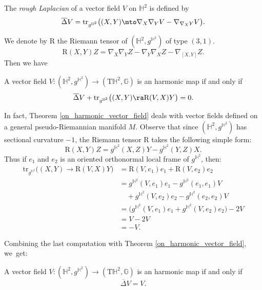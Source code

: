 \begin{defi}
The \emph{rough Laplacian} of a vector field $V$ on $\mathbb{H}^2$ is defined by
\[
\overline{\Delta}V=\mathrm{tr}_{g^{\mathbb{H}^2}}\big((X,Y)\mto \nabla_X\nabla_Y V-\nabla_{\nabla_X Y}V \big).
\]
\end{defi}
We denote by $\mathrm{R}$ the Riemann tensor of $(\mathbb{H}^2,g^{\mathbb{H}^2})$ of type $(3,1)$.
\[
\mathrm{R}(X,Y)Z=\nabla_X\nabla_YZ-\nabla_Y\nabla_XZ-\nabla_{[X,Y]}Z.
\]
Then we have
\begin{theorem}\label{on_harmonic_vector_field}
A vector field $V:(\mathbb{H}^2,g^{\mathbb{H}^2})\to(\mathrm{T}\mathbb{H}^2,\mathbb{G})$ is an harmonic map if and only if
\[
\overline{\Delta}V+\mathrm{tr}_{g^{\mathbb{H}^2}}\big((X,Y)\ra\mathrm{R}(V,X)Y \big)=0.
\]
\end{theorem}
In fact, Theorem \ref{on_harmonic_vector_field} deals with vector fields defined on a general pseudo-Riemannian manifold $M$. Observe that since $(\mathbb{H}^2,g^{\mathbb{H}^2})$ has sectional curvature $-1$, the Riemann tensor $\mathrm{R}$ takes the following simple form:
\[
\mathrm{R}(X,Y)Z=g^{\mathbb{H}^2}(X,Z)Y-g^{\mathbb{H}^2}(Y,Z)X.
\]
Thus if $e_1$ and $e_2$ is an oriented orthonormal local frame of $g^{\mathbb{H}^2}$, then:
\begin{align*}
\mathrm{tr}_{g^{\mathbb{H}^2}}\big((X,Y)\to\mathrm{R}(V,X)Y \big)
&=\mathrm{R}(V,e_1)e_1+\mathrm{R}(V,e_2)e_2 \\
&= g^{\mathbb{H}^2}(V,e_1)e_1 - g^{\mathbb{H}^2}(e_1,e_1)V \\
&\quad + g^{\mathbb{H}^2}(V,e_2)e_2 - g^{\mathbb{H}^2}(e_2,e_2)V \\
&= \big(g^{\mathbb{H}^2}(V,e_1)e_1+g^{\mathbb{H}^2}(V,e_2)e_2\big)-2V \\
&= V-2V \\
&= -V.
\end{align*}

Combining the last computation with Theorem \ref{on_harmonic_vector_field}, we~get:

\begin{cor}\label{cor_on_harmonic_vector_field}
A vector field $V:(\mathbb{H}^2,g^{\mathbb{H}^2})\to(\mathrm{T}\mathbb{H}^2,\mathbb{G})$ is an harmonic map if and only if
\[
\overline{\Delta}V=V.
\]
\end{cor}

